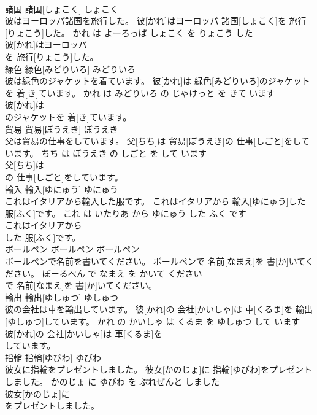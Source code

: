 \documentclass[8pt]{extreport}
\begin{document}
\begin{CJK}{UTF8}{min}
\\	諸国	諸国[しょこく]	しょこく	
\\	彼はヨーロッパ諸国を旅行した。	彼[かれ]はヨーロッパ 諸国[しょこく]を 旅行[りょこう]した。	かれ は よーろっぱ しょこく を りょこう した	
\\	彼[かれ]はヨーロッパ
\\	を 旅行[りょこう]した。			
\\	緑色	緑色[みどりいろ]	みどりいろ	
\\	彼は緑色のジャケットを着ています。	彼[かれ]は 緑色[みどりいろ]のジャケットを 着[き]ています。	かれ は みどりいろ の じゃけっと を きて います	
\\	彼[かれ]は
\\	のジャケットを 着[き]ています。			
\\	貿易	貿易[ぼうえき]	ぼうえき	
\\	父は貿易の仕事をしています。	父[ちち]は 貿易[ぼうえき]の 仕事[しごと]をしています。	ちち は ぼうえき の しごと を して います	
\\	父[ちち]は
\\	の 仕事[しごと]をしています。			
\\	輸入	輸入[ゆにゅう]	ゆにゅう	
\\	これはイタリアから輸入した服です。	これはイタリアから 輸入[ゆにゅう]した 服[ふく]です。	これ は いたりあ から ゆにゅう した ふく です	
\\	これはイタリアから
\\	した 服[ふく]です。			
\\	ボールペン	ボールペン	ボールペン	
\\	ボールペンで名前を書いてください。	ボールペンで 名前[なまえ]を 書[か]いてください。	ぼーるぺん で なまえ を かいて ください	
\\	で 名前[なまえ]を 書[か]いてください。			
\\	輸出	輸出[ゆしゅつ]	ゆしゅつ	
\\	彼の会社は車を輸出しています。	彼[かれ]の 会社[かいしゃ]は 車[くるま]を 輸出[ゆしゅつ]しています。	かれ の かいしゃ は くるま を ゆしゅつ して います	
\\	彼[かれ]の 会社[かいしゃ]は 車[くるま]を
\\	しています。			
\\	指輪	指輪[ゆびわ]	ゆびわ	
\\	彼女に指輪をプレゼントしました。	彼女[かのじょ]に 指輪[ゆびわ]をプレゼントしました。	かのじょ に ゆびわ を ぷれぜんと しました	
\\	彼女[かのじょ]に
\\	をプレゼントしました。			

\end{CJK}
\end{document}
